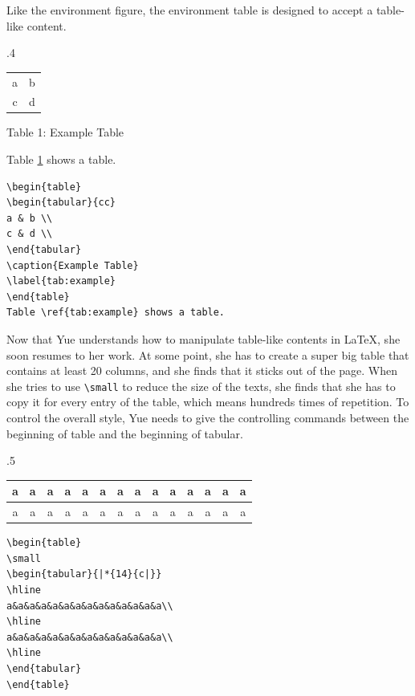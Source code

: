 Like the environment figure, the environment table is designed to accept a table-like content.
\begin{miniexammar}{.4\textandmarginlen}{
\begin{tabular}{cc}
a & b \\
c & d \\
\end{tabular}
\begin{center}
\hypertarget{fakedcaptiontab}{Table 1: Example Table}
\end{center}
Table \hyperlink{fakedcaptiontab}{1} shows a table.
}
\begin{lstlisting}
\begin{table}
\begin{tabular}{cc}
a & b \\
c & d \\
\end{tabular}
\caption{Example Table}
\label{tab:example}
\end{table}
Table \ref{tab:example} shows a table.
\end{lstlisting}
\end{miniexammar}

Now that Yue understands how to manipulate table-like contents in \LaTeX{}, she soon resumes to her work. At some point, she has to create a super big table that contains at least 20 columns, and she finds that it sticks out of the page. When she tries to use \verb=\small= to reduce the size of the texts, she finds that she has to copy it for every entry of the table, which means hundreds times of repetition. To control the overall style, Yue needs to give the controlling commands between the beginning of table and the beginning of tabular.

\begin{miniexammar}{.5\textandmarginlen}{
{
\tiny
\begin{tabular}{|*{14}{c|}}
\hline 
a&a&a&a&a&a&a&a&a&a&a&a&a&a\\
\hline
a&a&a&a&a&a&a&a&a&a&a&a&a&a\\
\hline
\end{tabular}
}
}
\begin{lstlisting}
\begin{table}
\small
\begin{tabular}{|*{14}{c|}}
\hline 
a&a&a&a&a&a&a&a&a&a&a&a&a&a\\
\hline
a&a&a&a&a&a&a&a&a&a&a&a&a&a\\
\hline
\end{tabular}
\end{table}
\end{lstlisting}
\end{miniexammar}

